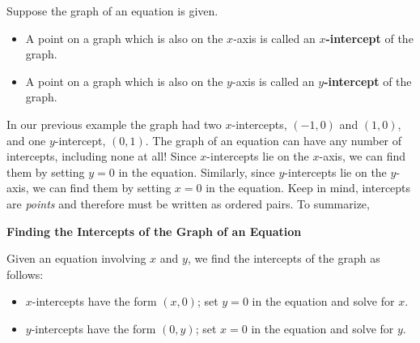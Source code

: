 \medskip

\colorbox{ResultColor}{\bbm


\begin{defn}  Suppose the graph of an equation is given.

\label{interceptsdefn}

\begin{itemize}

\item  A point on a graph which is also on the $x$-axis is called an  \textbf{\boldmath $x$-intercept} of the graph.

\item  A point on a graph which is also on the $y$-axis is called an  \textbf{\boldmath $y$-intercept} of the graph.

\end{itemize}

\end{defn}

\ebm}

\medskip

In our previous example the graph had two $x$-intercepts, $(-1,0)$ and $(1,0)$, and one $y$-intercept, $(0,1)$.  The graph of an equation can have any number of intercepts, including none at all!  Since $x$-intercepts lie on the $x$-axis, we can find them by setting $y = 0$ in the equation.  Similarly, since $y$-intercepts lie on the $y$-axis, we can find them by setting $x = 0$ in the equation.  Keep in mind, intercepts are \emph{points} and therefore must be written as ordered pairs.  To summarize,

\medskip

\colorbox{ResultColor}{\bbm


\centerline{\textbf{Finding the Intercepts of the Graph of an Equation}}

\medskip

\hspace{.17in} Given an equation involving $x$ and $y$, we find the intercepts of the graph as follows: 

\begin{itemize}

\item $x$-intercepts have the form $(x,0)$; set $y = 0$ in the equation and solve for $x$.  

\item $y$-intercepts have the form $(0,y)$; set $x = 0$ in the equation and solve for $y$. 

\end{itemize}

\ebm}

